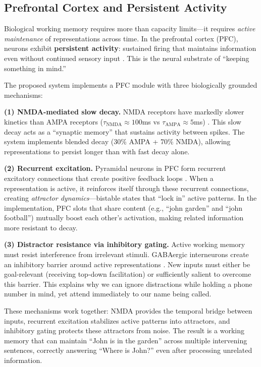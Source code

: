 \documentclass[11pt]{article}
\begin{document}
\subsection{Prefrontal Cortex and Persistent Activity}

Biological working memory requires more than capacity limits---it requires \emph{active maintenance} of representations across time. In the prefrontal cortex (PFC), neurons exhibit \textbf{persistent activity}: sustained firing that maintains information even without continued sensory input \citep{wang2001synaptic,compte2000synaptic}. This is the neural substrate of ``keeping something in mind.''

The proposed system implements a PFC module with three biologically grounded mechanisms:

\textbf{(1) NMDA-mediated slow decay.} NMDA receptors have markedly slower kinetics than AMPA receptors ($\tau_{\text{NMDA}} \approx 100$ms vs $\tau_{\text{AMPA}} \approx 5$ms) \citep{lisman1998role}. This slow decay acts as a ``synaptic memory'' that sustains activity between spikes. The system implements blended decay (30\% AMPA + 70\% NMDA), allowing representations to persist longer than with fast decay alone.

\textbf{(2) Recurrent excitation.} Pyramidal neurons in PFC form recurrent excitatory connections that create positive feedback loops \citep{wang2001synaptic}. When a representation is active, it reinforces itself through these recurrent connections, creating \emph{attractor dynamics}---bistable states that ``lock in'' active patterns. In the implementation, PFC slots that share content (e.g., ``john garden'' and ``john football'') mutually boost each other's activation, making related information more resistant to decay.

\textbf{(3) Distractor resistance via inhibitory gating.} Active working memory must resist interference from irrelevant stimuli. GABAergic interneurons create an inhibitory barrier around active representations \citep{miller2001integrative}. New inputs must either be goal-relevant (receiving top-down facilitation) or sufficiently salient to overcome this barrier. This explains why we can ignore distractions while holding a phone number in mind, yet attend immediately to our name being called.

These mechanisms work together: NMDA provides the temporal bridge between inputs, recurrent excitation stabilizes active patterns into attractors, and inhibitory gating protects these attractors from noise. The result is a working memory that can maintain ``John is in the garden'' across multiple intervening sentences, correctly answering ``Where is John?'' even after processing unrelated information.
\end{document}
